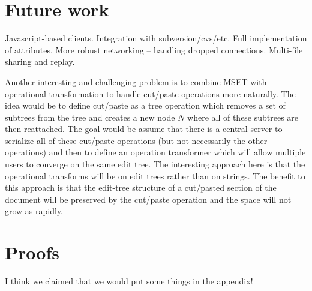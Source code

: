 \documentclass{amsart}
\begin{document}
\newpage
\section{Future work}
Javascript-based clients.  Integration with subversion/cvs/etc.
Full implementation of attributes. More robust networking --
handling dropped connections. Multi-file sharing and replay.

Another interesting and challenging problem is to combine MSET with
operational transformation to handle cut/paste operations more naturally.
The idea would be to define cut/paste as a tree operation which removes
a set of subtrees from the tree and creates a new node $N$ where all of
these subtrees are then reattached. The goal would be assume that there
is a central server to serialize all of these cut/paste operations (but
not necessarily the other operations) and then to define an operation
transformer which will allow multiple users to converge on the same
edit tree.  The interesting approach here is that the operational transforms
will be on edit trees rather than on strings.  The benefit to this approach
is that the edit-tree structure of a cut/pasted section of the document
will be preserved by the cut/paste operation and the space will not grow
as rapidly. 




\appendix
\section{Proofs}
I think we claimed that we would put some things in the appendix!
\end{document}
